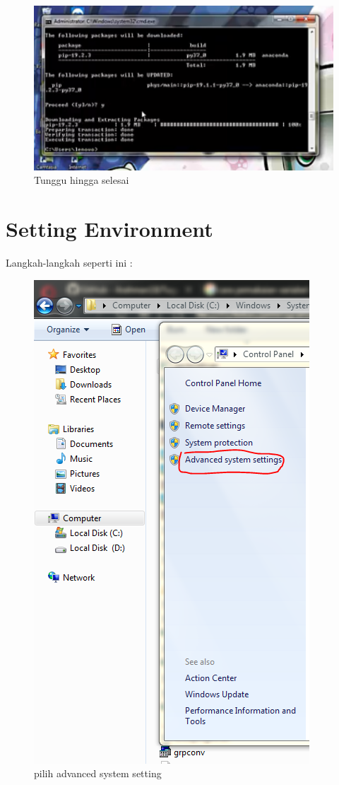 	\begin{figure}
	\includegraphics[scale=0.5]{section/pip2}
	\centering
	\caption{Tunggu hingga selesai}
	\end{figure}
	
\section{Setting Environment}
Langkah-langkah seperti ini : 

	\begin{figure}
	\includegraphics[scale=0.5]{section/envirotment1}
	\centering
	\caption{pilih advanced system setting}
	\end{figure}	
	
